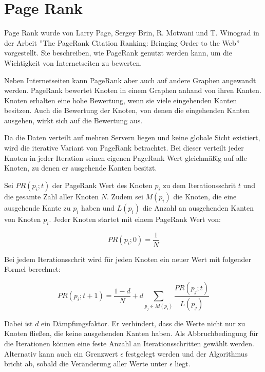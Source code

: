 \section{Page Rank}

Page Rank wurde von Larry Page, Sergey Brin, R. Motwani und T. Winograd in der Arbeit ''The PageRank Citation Ranking:
Bringing Order to the Web''\cite{Page98thepagerank} vorgestellt. Sie beschreiben, wie PageRank genutzt werden kann, um die Wichtigkeit von Internetseiten zu bewerten.

Neben Internetseiten kann PageRank aber auch auf andere Graphen angewandt werden.
PageRank bewertet Knoten in einem Graphen anhand von ihren Kanten. Knoten erhalten eine hohe Bewertung, wenn sie viele eingehenden Kanten besitzen. Auch die Bewertung der Knoten, von denen die eingehenden Kanten ausgehen, wirkt sich auf die Bewertung aus.

Da die Daten verteilt auf mehren Servern liegen und keine globale Sicht existiert, wird die iterative Variant von PageRank betrachtet.
Bei dieser verteilt jeder Knoten in jeder Iteration seinen eigenen PageRank Wert gleichmäßig auf alle Knoten, zu denen er ausgehende Kanten besitzt. 


Sei $ PR(p_{i}; t)$ der PageRank Wert des Knoten $p_{i}$ zu dem Iterationsschrit $t$ und die gesamte Zahl aller Knoten $N$.
Zudem sei $M(p_{i})$ die Knoten, die eine ausgehende Kante zu $p_{i}$ haben und $L(p_{i})$ die Anzahl an ausgehenden Kanten von Knoten $p_{i}$.
Jeder Knoten startet mit einem PageRank Wert von:

\[  PR(p_{i}; 0) = \frac{1}{N}   \]

Bei jedem Iterationsschrit wird für jeden Knoten ein neuer Wert mit folgender Formel berechnet:

\[ PR(p_{i}; t+1) = \frac{1 - d}{N} + d \sum_{p_{j} \in M(p_{i})} \frac{PR(p_{j}; t)}{L(p_{j})} \]


Dabei ist $d$ ein Dämpfungsfaktor. Er verhindert, dass die Werte nicht nur zu Knoten fließen, die keine ausgehenden Kanten haben.
Als Abbruchbedingung für die Iterationen können eine feste Anzahl an Iterationsschritten gewählt werden. Alternativ kann auch ein Grenzwert $\epsilon$ festgelegt werden und der Algorithmus bricht ab, sobald die Veränderung aller Werte unter $\epsilon$ liegt.
